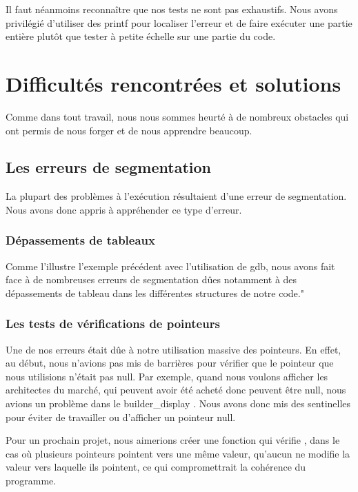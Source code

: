 \documentclass{article}
\begin{document}
     Il faut néanmoins reconnaître que nos tests ne sont pas exhaustifs. Nous avons privilégié d'utiliser des printf pour localiser l'erreur et de faire exécuter une partie entière plutôt que tester à petite échelle sur une partie du code.

            



    
\section{Difficultés rencontrées et solutions}
Comme dans tout travail, nous nous sommes heurté à de nombreux obstacles qui ont permis de nous forger et de nous apprendre beaucoup.

    \subsection{Les erreurs de segmentation}
    La plupart des problèmes à l'exécution résultaient d'une erreur de segmentation. Nous avons donc appris à appréhender ce type d'erreur.
    
        \subsubsection{Dépassements de tableaux}
         \hspace{1em}Comme l'illustre l'exemple précédent avec l'utilisation de gdb, nous avons fait face à de nombreuses erreurs de segmentation dûes  notamment à des dépassements de tableau dans les différentes structures de notre code."
         
        \subsubsection{Les tests de vérifications de pointeurs} %
        \hspace{1em} Une de nos erreurs était dûe à notre utilisation massive des pointeurs. En effet, au début, nous n'avions pas mis de barrières pour vérifier que le pointeur que nous utilisions n'était pas null. Par exemple, quand nous voulons afficher les architectes du marché, qui peuvent avoir été acheté donc peuvent être null, nous avions un problème dans le builder\_display . Nous avons donc mis des sentinelles pour éviter de travailler ou d'afficher un pointeur null.

            Pour un prochain projet, nous aimerions créer une fonction qui vérifie , dans le cas où plusieurs pointeurs pointent vers une même valeur, qu'aucun ne modifie la valeur vers laquelle ils pointent, ce qui compromettrait la cohérence du programme.
\end{document}
